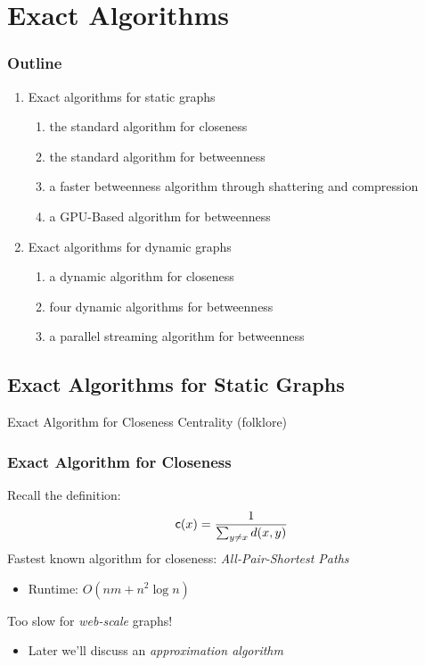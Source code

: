 
\section{Exact Algorithms}
\begin{frame}
  \frametitle{Outline}
  \begin{enumerate}
    \item Exact algorithms for static graphs
      \begin{enumerate}
        \item the standard algorithm for closeness
        \item the standard algorithm for betweenness
        \item a faster betweenness algorithm through shattering and compression
        \item a GPU-Based algorithm for betweenness
      \end{enumerate}
    \item Exact algorithms for dynamic graphs
      \begin{enumerate}
        \item a dynamic algorithm for closeness
        \item four dynamic algorithms for betweenness
        \item a parallel streaming algorithm for betweenness
      \end{enumerate}
  \end{enumerate}
\end{frame}

\subsection{Exact Algorithms for Static Graphs}

\begin{frame}
  \centering
  \vfill
  {\huge Exact Algorithm for Closeness Centrality}
  \vfill
  {\Large(folklore)}
  \vfill
\end{frame}

\begin{frame}
  \frametitle{Exact Algorithm for Closeness}
    \vfill
    Recall the definition:
    \[
      \mathsf{c}(x)=\frac{1}{\sum_{y\neq x}d(x,y)}
    \]
    \vfill
    \pause
    Fastest known algorithm for closeness: \emph{All-Pair-Shortest Paths}
    \begin{itemize}
      \item Runtime: $O(nm+n^2\log n)$
    \end{itemize}
    \vfill
    \pause
    Too slow for \emph{web-scale} graphs!
    \begin{itemize}
      \item Later we'll discuss an \emph{approximation algorithm}
    \end{itemize}
    \vfill
\end{frame}

